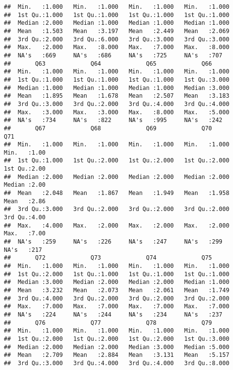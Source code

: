 \documentclass[
]{article}
\begin{document}
\begin{verbatim}
##  Min.   :1.000   Min.   :1.000   Min.   :1.000   Min.   :1.000  
##  1st Qu.:1.000   1st Qu.:1.000   1st Qu.:1.000   1st Qu.:1.000  
##  Median :2.000   Median :1.000   Median :1.000   Median :1.000  
##  Mean   :1.503   Mean   :3.197   Mean   :2.449   Mean   :2.069  
##  3rd Qu.:2.000   3rd Qu.:6.000   3rd Qu.:3.000   3rd Qu.:3.000  
##  Max.   :2.000   Max.   :8.000   Max.   :7.000   Max.   :8.000  
##  NA's   :669     NA's   :686     NA's   :725     NA's   :707    
##       Q63             Q64             Q65             Q66       
##  Min.   :1.000   Min.   :1.000   Min.   :1.000   Min.   :1.000  
##  1st Qu.:1.000   1st Qu.:1.000   1st Qu.:1.000   1st Qu.:3.000  
##  Median :1.000   Median :1.000   Median :1.000   Median :3.000  
##  Mean   :1.895   Mean   :1.678   Mean   :2.507   Mean   :3.183  
##  3rd Qu.:3.000   3rd Qu.:2.000   3rd Qu.:4.000   3rd Qu.:4.000  
##  Max.   :3.000   Max.   :3.000   Max.   :8.000   Max.   :5.000  
##  NA's   :734     NA's   :822     NA's   :995     NA's   :242    
##       Q67             Q68             Q69             Q70             Q71      
##  Min.   :1.000   Min.   :1.000   Min.   :1.000   Min.   :1.000   Min.   :1.00  
##  1st Qu.:1.000   1st Qu.:2.000   1st Qu.:2.000   1st Qu.:2.000   1st Qu.:2.00  
##  Median :2.000   Median :2.000   Median :2.000   Median :2.000   Median :2.00  
##  Mean   :2.048   Mean   :1.867   Mean   :1.949   Mean   :1.958   Mean   :2.86  
##  3rd Qu.:3.000   3rd Qu.:2.000   3rd Qu.:2.000   3rd Qu.:2.000   3rd Qu.:4.00  
##  Max.   :4.000   Max.   :2.000   Max.   :2.000   Max.   :2.000   Max.   :7.00  
##  NA's   :259     NA's   :226     NA's   :247     NA's   :299     NA's   :217   
##       Q72             Q73             Q74             Q75       
##  Min.   :1.000   Min.   :1.000   Min.   :1.000   Min.   :1.000  
##  1st Qu.:2.000   1st Qu.:1.000   1st Qu.:1.000   1st Qu.:1.000  
##  Median :3.000   Median :2.000   Median :2.000   Median :1.000  
##  Mean   :3.232   Mean   :2.073   Mean   :2.061   Mean   :1.749  
##  3rd Qu.:4.000   3rd Qu.:2.000   3rd Qu.:2.000   3rd Qu.:2.000  
##  Max.   :7.000   Max.   :7.000   Max.   :7.000   Max.   :7.000  
##  NA's   :224     NA's   :244     NA's   :234     NA's   :237    
##       Q76             Q77             Q78             Q79       
##  Min.   :1.000   Min.   :1.000   Min.   :1.000   Min.   :1.000  
##  1st Qu.:2.000   1st Qu.:2.000   1st Qu.:2.000   1st Qu.:3.000  
##  Median :2.000   Median :2.000   Median :3.000   Median :5.000  
##  Mean   :2.709   Mean   :2.884   Mean   :3.131   Mean   :5.157  
##  3rd Qu.:3.000   3rd Qu.:4.000   3rd Qu.:4.000   3rd Qu.:8.000  

\end{verbatim}
\end{document}
